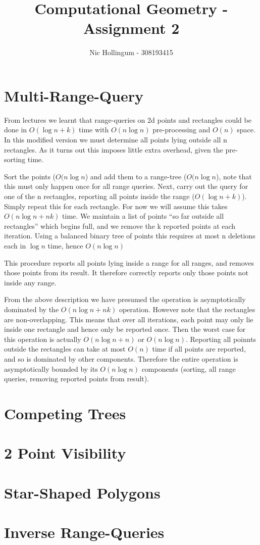
\author{Nic Hollingum - 308193415}
\title{Computational Geometry - Assignment 2}

\addtolength{\oddsidemargin}{-.875in}
\addtolength{\evensidemargin}{-.875in}
\addtolength{\textwidth}{1.75in}
\addtolength{\topmargin}{-.875in}
\addtolength{\textheight}{1.75in}


\maketitle

\section {Multi-Range-Query}
From lectures we learnt that range-queries on 2d points and rectangles could be done in $O(\log n + k)$ time with $O(n \log n)$ pre-processing and $O(n)$ space.
In this modified version we must determine all points lying outside all n rectangles.
As it turns out this imposes little extra overhead, given the pre-sorting time.

Sort the points ($O(n \log n$) and add them to a range-tree ($O(n \log n$), note that this must only happen once for all range queries.
Next, carry out the query for one of the n rectangles, reporting all points inside the range ($O(\log n + k)$).
Simply repeat this for each rectangle.
For now we will assume this takes $O(n \log n + nk)$ time.
We maintain a list of points ``so far outside all rectangles'' which begins full, and we remove the k reported points at each iteration.
Using a balanced binary tree of points this requires at most n deletions each in $\log n$ time, hence $O(n \log n)$

This procedure reports all points lying inside a range for all ranges, and removes those points from its result.
It therefore correctly reports only those points not inside any range.

From the above description we have presumed the operation is asymptotically dominated by the $O(n \log n + nk)$ operation.
However note that the rectangles are non-overlapping.
This means that over all iterations, each point may only lie inside one rectangle and hence only be reported once.
Then the worst case for this operation is actually $O(n \log n + n)$ or $O(n \log n)$.
Reporting all poinnts outside the rectangles can take at most $O(n)$ time if all points are reported, and so is dominated by other components.
Therefore the entire operation is asymptotically bounded by its $O(n \log n)$ components (sorting, all range queries, removing reported points from result).

\section {Competing Trees}

\section {2 Point Visibility}

\section {Star-Shaped Polygons}

\section {Inverse Range-Queries}


